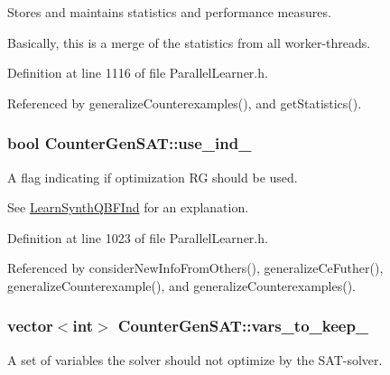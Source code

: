 Stores and maintains statistics and performance measures. 

Basically, this is a merge of the statistics from all worker-\/threads. 

Definition at line 1116 of file Parallel\-Learner.\-h.



Referenced by generalize\-Counterexamples(), and get\-Statistics().

\hypertarget{classCounterGenSAT_a4f76493e0c49329ae7f628af99a450f4}{
\subsubsection[{use\-\_\-ind\-\_\-}]{\setlength{\rightskip}{0pt plus 5cm}bool Counter\-Gen\-S\-A\-T\-::use\-\_\-ind\-\_\-\hspace{0.3cm}{\ttfamily [protected]}}}\label{classCounterGenSAT_a4f76493e0c49329ae7f628af99a450f4}


A flag indicating if optimization R\-G should be used. 

See \hyperlink{classLearnSynthQBFInd}{Learn\-Synth\-Q\-B\-F\-Ind} for an explanation. 

Definition at line 1023 of file Parallel\-Learner.\-h.



Referenced by consider\-New\-Info\-From\-Others(), generalize\-Ce\-Futher(), generalize\-Counterexample(), and generalize\-Counterexamples().

\hypertarget{classCounterGenSAT_a0c568c2e441491d24a5a98623fa6ce6a}{
\subsubsection[{vars\-\_\-to\-\_\-keep\-\_\-}]{\setlength{\rightskip}{0pt plus 5cm}vector$<$int$>$ Counter\-Gen\-S\-A\-T\-::vars\-\_\-to\-\_\-keep\-\_\-\hspace{0.3cm}{\ttfamily [protected]}}}\label{classCounterGenSAT_a0c568c2e441491d24a5a98623fa6ce6a}


A set of variables the solver should not optimize by the S\-A\-T-\/solver. 

